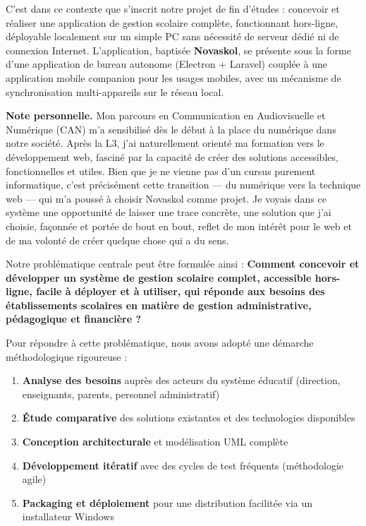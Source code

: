 \documentclass[12pt,a4paper,twoside]{report}
\begin{document}
C'est dans ce contexte que s'inscrit notre projet de fin d'études : concevoir et réaliser une application de gestion scolaire complète, fonctionnant hors-ligne, déployable localement sur un simple PC sans nécessité de serveur dédié ni de connexion Internet. L'application, baptisée \textbf{Novaskol}, se présente sous la forme d'une application de bureau autonome (Electron + Laravel) couplée à une application mobile companion pour les usages mobiles, avec un mécanisme de synchronisation multi-appareils sur le réseau local.

\textbf{Note personnelle.} Mon parcours en Communication en Audiovisuelle et Numérique (CAN) m'a sensibilisé dès le début à la place du numérique dans notre société. Après la L3, j'ai naturellement orienté ma formation vers le développement web, fasciné par la capacité de créer des solutions accessibles, fonctionnelles et utiles. Bien que je ne vienne pas d'un cursus purement informatique, c'est précisément cette transition — du numérique vers la technique web — qui m'a poussé à choisir Novaskol comme projet. Je voyais dans ce système une opportunité de laisser une trace concrète, une solution que j'ai choisie, façonnée et portée de bout en bout, reflet de mon intérêt pour le web et de ma volonté de créer quelque chose qui a du sens.

Notre problématique centrale peut être formulée ainsi : \textbf{Comment concevoir et développer un système de gestion scolaire complet, accessible hors-ligne, facile à déployer et à utiliser, qui réponde aux besoins des établissements scolaires en matière de gestion administrative, pédagogique et financière ?}

Pour répondre à cette problématique, nous avons adopté une démarche méthodologique rigoureuse :
\begin{enumerate}
    \item \textbf{Analyse des besoins} auprès des acteurs du système éducatif (direction, enseignants, parents, personnel administratif)
    \item \textbf{Étude comparative} des solutions existantes et des technologies disponibles
    \item \textbf{Conception architecturale} et modélisation UML complète
    \item \textbf{Développement itératif} avec des cycles de test fréquents (méthodologie agile)
    \item \textbf{Packaging et déploiement} pour une distribution facilitée via un installateur Windows
\end{enumerate}
\end{document}
